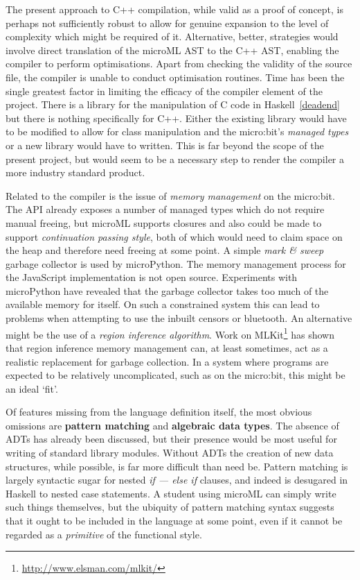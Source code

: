 \documentclass[12pt, a4paper]{report}
\begin{document}
The present approach to C++ compilation, while valid as a proof of concept, is perhaps not
sufficiently robust to allow for genuine expansion to the level of complexity which might be
required of it. Alternative, better, strategies would involve direct translation of the microML AST
to the C++ AST, enabling the compiler to perform optimisations. Apart from checking the validity of
the source file, the compiler is unable to conduct optimisation routines. Time has been the single
greatest factor in limiting the efficacy of the compiler element of the project. There is a library
for the manipulation of C code in Haskell~\ref{deadend} but there is nothing specifically for C++.
Either the existing library would have to be modified to allow for class manipulation and the
micro:bit's \textit{managed types} or a new library would have to written. This is far beyond the
scope of the present project, but would seem to be a necessary step to render the compiler a more
industry standard product.

Related to the compiler is the issue of \textit{memory management} on the micro:bit. The API already
exposes a number of managed types which do not require manual freeing, but microML supports closures
and also could be made to support \textit{continuation passing style}, both of which would need to
claim space on the heap and therefore need freeing at some point. A simple \textit{mark \& sweep}
garbage collector is used by microPython. The memory management process for the JavaScript
implementation is not open source. Experiments with microPython have revealed that the garbage
collector takes too much of the available memory for itself. On such a constrained system this can
lead to problems when attempting to use the inbuilt censors or bluetooth. An alternative might be
the use of a \textit{region inference algorithm}\cite{Tofte:1998:RIA:291891.291894}. Work on
MLKit\footnote{\url{http://www.elsman.com/mlkit/}} has shown that region inference memory management
can, at least sometimes, act as a realistic replacement for garbage collection. In a system where
programs are expected to be relatively uncomplicated, such as on the micro:bit, this might be an
ideal `fit'.

Of features missing from the language definition itself, the most obvious omissions are
\textbf{pattern matching} and \textbf{algebraic data types}. The absence of ADTs has already been
discussed, but their presence would be most useful for writing of standard library modules. Without
ADTs the creation of new data structures, while possible, is far more difficult than need be.
Pattern matching is largely syntactic sugar for nested \textit{if --- else if} clauses, and indeed
is desugared in Haskell to nested case statements. A student using microML can simply write such
things themselves, but the ubiquity of pattern matching syntax suggests that it ought to be included
in the language at some point, even if it cannot be regarded as a \textit{primitive} of the
functional style. 
\end{document}
